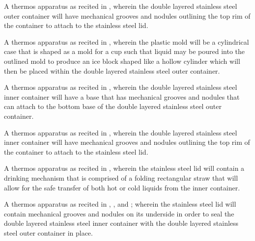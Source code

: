 \documentclass[english]{uspatent}
\begin{document}

 A thermos apparatus as recited in , wherein the double layered stainless steel outer container will have mechanical grooves and nodules outlining the top rim of the container to attach to the stainless steel lid.


A thermos apparatus as recited in , wherein the plastic mold will be a cylindrical case that is shaped as a mold for a cup such that liquid may be poured into the outlined mold to produce an ice block shaped like a hollow cylinder which will then be placed within the double layered stainless steel outer container.


 A thermos apparatus as recited in , wherein the double layered stainless steel inner container will have a base that has mechanical grooves and nodules that can attach to the bottom base of the double layered stainless steel outer container.


A thermos apparatus as recited in , wherein the double layered stainless steel inner container will have mechanical grooves and nodules outlining the top rim of the container to attach to the stainless steel lid.


A thermos apparatus as recited in , wherein the stainless steel lid will contain a drinking mechanism that is comprised of a folding rectangular straw that will allow for the safe transfer of both hot or cold liquids from the inner container.


A thermos apparatus as recited in , , and ; wherein the stainless steel lid will contain mechanical grooves and nodules on its underside in order to seal the double layered stainless steel inner container with the double layered stainless steel outer container in place.

\patentClaimsEnd
\end{document}
